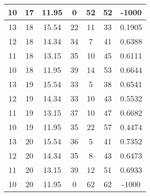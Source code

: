 \documentclass[letterpaper, 12pt]{article}
\begin{document}
\begin{longtable}{|c|c|c|c|c|c|c|}
10 & 17 & 11.95 & 0 & 52 & 52 & -1000 \\
\hline
13 & 18 & 15.54 & 22 & 11 & 33 & 0.1905 \\
\hline
12 & 18 & 14.34 & 34 & 7 & 41 & 0.6388 \\
\hline
11 & 18 & 13.15 & 35 & 10 & 45 & 0.6111 \\
\hline
10 & 18 & 11.95 & 39 & 14 & 53 & 0.6644 \\
\hline
13 & 19 & 15.54 & 33 & 5 & 38 & 0.6541 \\
\hline
12 & 19 & 14.34 & 33 & 10 & 43 & 0.5532 \\
\hline
11 & 19 & 13.15 & 37 & 10 & 47 & 0.6682 \\
\hline
10 & 19 & 11.95 & 35 & 22 & 57 & 0.4474 \\
\hline
13 & 20 & 15.54 & 36 & 5 & 41 & 0.7352 \\
\hline
12 & 20 & 14.34 & 35 & 8 & 43 & 0.6473 \\
\hline
11 & 20 & 13.15 & 39 & 12 & 51 & 0.6933 \\
\hline
10 & 20 & 11.95 & 0 & 62 & 62 & -1000 \\
\hline
\end{longtable}
\end{document}
